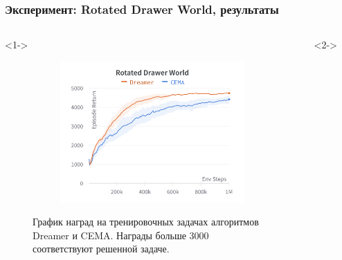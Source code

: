 \begin{frame}
\frametitle{Эксперимент: Rotated Drawer World, результаты}

\begin{columns}[t]
\begin{column}{0.48\linewidth}<1->
    \begin{figure}
        \begin{subfigure}{\linewidth}
        \centering
          \includegraphics[height=0.5\paperheight]{images/performance/rotated_drawer_train.png}
        \end{subfigure}
      \caption{График наград на тренировочных задачах алгоритмов Dreamer и CEMA. Награды больше $3000$ соответствуют решенной задаче. }
    \end{figure}
\end{column}
\hfill
\begin{column}{0.48\linewidth}<2->
    \begin{figure}
        \begin{subfigure}{\linewidth}
          \centering

\end{subfigure}
\end{figure}
\end{column}
\end{columns}
\end{frame}

